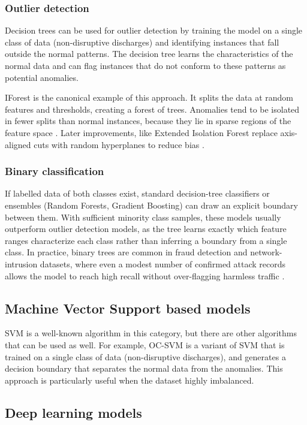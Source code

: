 \subsubsection{Outlier detection}

Decision trees can be used for outlier detection by training the model on a single class of data (non-disruptive discharges) and identifying instances that fall outside the normal patterns. The decision tree learns the characteristics of the normal data and can flag instances that do not conform to these patterns as potential anomalies. 

\ac{IForest} is the canonical example of this approach. It splits the data at random features and thresholds, creating a forest of trees. Anomalies tend to be isolated in fewer splits than normal instances, because they lie in sparse regions of the feature space \autocite{inproceedings}. Later improvements, like Extended Isolation Forest replace axis-aligned cuts with random hyperplanes to reduce bias \autocite{haririExtendedIsolationForest2019}.

\subsubsection{Binary classification}

If labelled data of both classes exist, standard decision-tree classifiers or ensembles (Random Forests, Gradient Boosting) can draw an explicit boundary between them. With sufficient minority class samples, these models usually outperform outlier detection models, as the tree learns exactly which feature ranges characterize each class rather than inferring a boundary from a single class. In practice, binary trees are common in fraud detection and network-intrusion datasets, where even a modest number of confirmed attack records allows the model to reach high recall without over-flagging harmless traffic \autocite{354051491,binary-classification-for-fraud-detection}.

\subsection{Machine Vector Support based models}

\ac{SVM} is a well-known algorithm in this category, but there are other algorithms that can be used as well. For example, \ac{OC-SVM} is a variant of \ac{SVM} that is trained on a single class of data (non-disruptive discharges), and generates a decision boundary that separates the normal data from the anomalies. This approach is particularly useful when the dataset highly imbalanced.


\subsection{Deep learning models}

